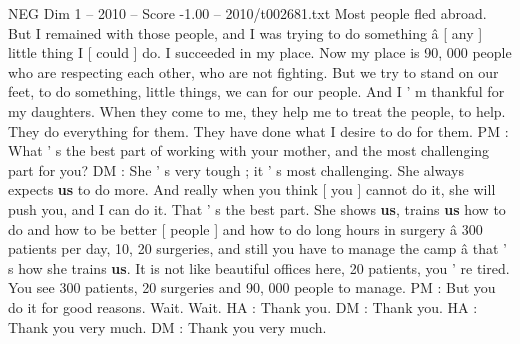 \begin{textsample}{NEG Dim 1 – 2010 – Score -1.00 – 2010/t002681.txt}
Most people fled abroad.
But I remained with those people, and I was trying to do something â [ any ] little thing I [ could ] do.
I succeeded in my place.
Now my place is 90, 000 people who are respecting each other, who are not fighting.
But we try to stand on our feet, to do something, little things, we can for our people.
And I ' m thankful for my daughters.
When they come to me, they help me to treat the people, to help.
They do everything for them.
They have done what I desire to do for them.
PM : What ' s the best part of working with your mother, and the most challenging part for you?
DM : She ' s very tough ; it ' s most challenging.
She always expects \textbf{us} to do more.
And really when you think [ you ] cannot do it, she will push you, and I can do it.
That ' s the best part.
She shows \textbf{us}, trains \textbf{us} how to do and how to be better [ people ] and how to do long hours in surgery â 300 patients per day, 10, 20 surgeries, and still you have to manage the camp â that ' s how she trains \textbf{us}.
It is not like beautiful offices here, 20 patients, you ' re tired.
You see 300 patients, 20 surgeries and 90, 000 people to manage.
PM : But you do it for good reasons.
Wait.
Wait.
HA : Thank you.
DM : Thank you.
HA : Thank you very much.
DM : Thank you very much.

\end{textsample}
